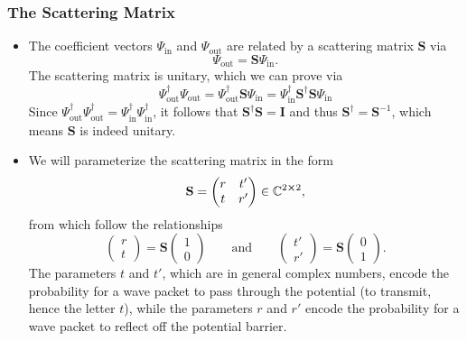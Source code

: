 \documentclass[11pt, a4paper]{article}
\newcommand{\mat}[1]{\mathbf{#1}}  %
\renewcommand{\SS}{\mat{S}}  %
\begin{document}
\subsubsection{The Scattering Matrix}
\begin{itemize}
    \item The coefficient vectors $ \Psi_{\text{in}} $ and $ \Psi_{\text{out}} $ are related by a scattering matrix $ \SS $ via
    \begin{equation*}
        \Psi_{\text{out}} = \SS \Psi_{\text{in}}.
    \end{equation*}
    The scattering matrix is unitary, which we can prove via
    \begin{equation*}
        \Psi_{\text{out}}^{\dagger} \Psi_{\text{out}} = \Psi_{\text{out}}^{\dagger} \SS \Psi_{\text{in}} = \Psi_{\text{in}}^{\dagger} \SS^{\dagger} \SS \Psi_{\text{in}}
    \end{equation*}
    Since $ \Psi_{\text{out}}^{\dagger} \Psi_{\text{out}}^{\dagger} = \Psi_{\text{in}}^{\dagger} \Psi_{\text{in}}^{\dagger} $, it follows that $ \SS^{\dagger} \SS = \mathbf{I} $ and thus $ \SS^{\dagger} = \SS^{-1} $, which means $ \SS $ is indeed unitary.

    \item We will parameterize the scattering matrix in the form
    \begin{equation*}
        \SS = 
        \begin{pmatrix}
            r & t'\\
            t & r'
        \end{pmatrix} \in \mathbb{C}^{2 \cross 2},
    \end{equation*}
    from which follow the relationships
    \begin{equation*}
        \begin{pmatrix}
            r\\
            t
        \end{pmatrix} 
        = \SS
        \begin{pmatrix}
            1\\
            0
        \end{pmatrix}
        \qquad \text{and} \qquad 
        \begin{pmatrix}
            t'\\
            r'
        \end{pmatrix}
        = \SS
        \begin{pmatrix}
            0\\
            1
        \end{pmatrix}.
    \end{equation*}
    The parameters $ t $ and $ t' $, which are in general complex numbers, encode the probability for a wave packet to pass through the potential (to transmit, hence the letter $ t $), while the parameters $ r $ and $ r' $ encode the probability for a wave packet to reflect off the potential barrier.
    

\end{itemize}
\end{document}
